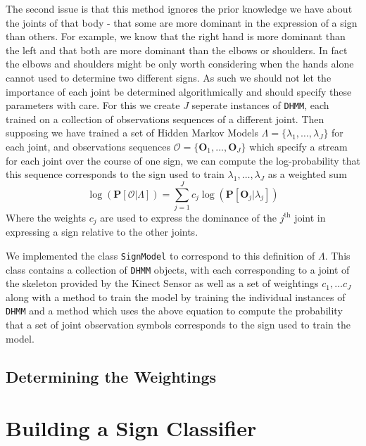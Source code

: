 The second issue is that this method ignores the prior knowledge we have about the joints of that body - that some are more dominant in the expression of a sign than others. For example, we know that the right hand is more dominant than the left and that both are more dominant than the elbows or shoulders. In fact the elbows and shoulders might be only worth considering when the hands alone cannot used to determine two different signs. As such we should not let the importance of each joint be determined algorithmically and should specify these parameters with care. For this we create $J$ seperate instances of \verb|DHMM|, each trained on a collection of observations sequences of a different joint. Then supposing we have trained a set of Hidden Markov Models $\Lambda = \{\lambda_1, \dots, \lambda_J\}$ for each joint, and observations sequences $\mathcal{O} = \{\mathbf{O}_1,\dots, \mathbf{O}_J\}$ which specify a stream for each joint over the course of one sign, we can compute the log-probability that this sequence corresponds to the sign used to train $\lambda_1, \dots, \lambda_J$ as a weighted sum
\begin{equation*}
\log(\mathbf{P}[\mathcal{O} | \Lambda ]) = \sum_{j=1}^{J} c_j \log(\mathbf{P}[\mathbf{O}_j | \lambda_j])
\end{equation*}
Where the weights $c_j$ are used to express the dominance of the $j^\text{th}$ joint in expressing a sign relative to the other joints.

We implemented the class \verb|SignModel| to correspond to this definition of $\Lambda$. This class contains a collection of \verb|DHMM| objects, with each corresponding to a joint of the skeleton provided by the Kinect Sensor as well as a set of weightings $c_1, \dots c_J$ along with a method to train the model by training the individual instances of \verb|DHMM| and a method which uses the above equation to compute the probability that a set of joint observation symbols corresponds to the sign used to train the model.

\subsection{Determining the Weightings}

\section{Building a Sign Classifier}


